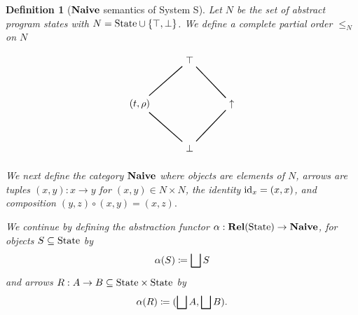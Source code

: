 \documentclass{article}
\newtheorem{definition}[theorem]{Definition}
\newcommand{\fail}{\ensuremath \text{$\uparrow$}}
\newcommand{\State}{\ensuremath \text{State}}
\newcommand{\id}{\ensuremath \operatorname{id}}
\newcommand{\Rel}{\ensuremath \mathbf{Rel}}
\newcommand{\Naive}{\ensuremath \mathbf{Naive}}
\newcommand{\lub}{\ensuremath \bigsqcup}
\begin{document}
\begin{definition}[$\Naive$ semantics of System S] \normalfont
  Let $N$ be the set of abstract program states with $N = \State \cup \lbrace \top, \bot \rbrace$. We define a complete partial order $\leq_N$ on $N$
  \[
    \begin{tikzpicture}
     \matrix (m) [matrix of math nodes, row sep=3em, column sep=3em]
    {          & \top &       \\
      (t,\rho) &      & \fail \\
               & \bot &       \\
    };

    \draw [thick] (m-2-1) -- (m-1-2);
    \draw [thick] (m-2-3) -- (m-1-2);
    \draw [thick] (m-3-2) -- (m-2-1);
    \draw [thick] (m-3-2) -- (m-2-3);
    \end{tikzpicture}
  \]

  We next define the category $\Naive$ where objects are elements of $N$, arrows are tuples $(x,y) : x \rightarrow y$ for $(x,y) \in N \times N$, the identity $\id_x = (x,x)$, and  composition $(y,z) \circ (x,y) = (x,z).$

  We continue by defining the abstraction functor $\alpha : \Rel(\State) \rightarrow \Naive$, for objects $S \subseteq \State$ by
  \[
     \alpha(S) \coloneqq \lub S
  \]
  and arrows $R : A \rightarrow B \subseteq \State \times \State$ by
  \[
     \alpha(R) \coloneqq (\lub A, \lub B).
  \]

   
\end{definition}
\end{document}
